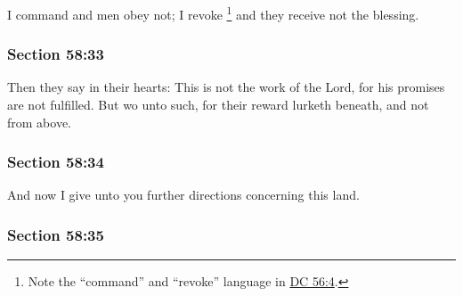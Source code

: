 		I command and men obey not; I revoke%
			\footnote{%
				Note the ``command'' and ``revoke'' language in \hyperref[DC56-4]{DC 56:4}.
				}
		and they receive not the blessing.


	\subsubsection{Section 58:33} %
		\label{DC58-33}

		Then they say in their hearts: This is not the work of the Lord, for his promises are not fulfilled. But wo unto such, for their reward lurketh beneath, and not from above.


	\subsubsection{Section 58:34} %
		\label{DC58-34}

		And now I give unto you further directions concerning this land.


	\subsubsection{Section 58:35} %
		\label{DC58-35}

